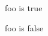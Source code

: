 \documentclass{article}
\begin{document}
	
\newif\iffoo

\footrue

\iffoo
foo is true
\else
foo is false
\fi

\foofalse

\iffoo
foo is true
\else
foo is false
\fi
	
\end{document}
